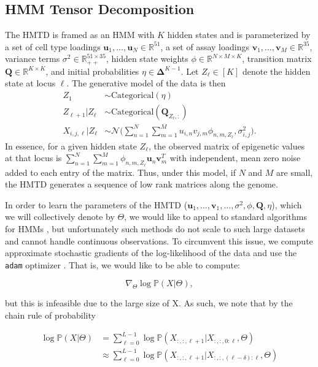 \documentclass[11pt]{article}
\begin{document}
\subsection{HMM Tensor Decomposition}
The HMTD is framed as an HMM with $K$ hidden states and is parameterized by a set of cell type loadings $\mathbf{u}_1,\ldots,\mathbf{u}_N \in \mathbb{R}^{51}$, a set of assay loadings $\mathbf{v}_1,\ldots,\mathbf{v}_M \in \mathbb{R}^{35}$, variance terms $\sigma^2 \in \mathbb{R}_{++}^{51\times35}$, hidden state weights $\phi \in \mathbb{R}^{N \times M \times K}$, transition matrix $\mathbf{Q} \in \mathbb{R}^{K \times K}$, and initial probabilities $\eta \in \mathbf{\Delta}^{K-1}$. Let $Z_\ell \in [K]$ denote the hidden state at locus $\ell$. The generative model of the data is then
\begin{align*}
Z_1 &\sim \text{Categorical}(\eta)\\
Z_{\ell + 1} | Z_{\ell} &\sim \text{Categorical}(\mathbf{Q}_{Z_\ell, :})\\
X_{i, j, \ell} | Z_{\ell} & \sim \mathcal{N}\Bigg(\sum_{n=1}^N\sum_{m=1}^M u_{i,n} v_{j,m} \phi_{n,m,Z_\ell}, \sigma^2_{i,j}\Bigg).
\end{align*}
In essence, for a given hidden state $Z_{\ell}$, the observed matrix of epigenetic values at that locus is $\sum_{n=1}^N \sum_{m=1}^M \phi_{n,m,Z_{\ell}}\mathbf{u}_n\mathbf{v}_m^T$ with independent, mean zero noise added to each entry of the matrix. Thus, under this model, if $N$ and $M$ are small, the HMTD generates a sequence of low rank matrices along the genome.

In order to learn the parameters of the HMTD ($\mathbf{u}_1,\ldots,\mathbf{v}_1,\ldots,\sigma^2,\phi,\mathbf{Q},\eta$), which we will collectively denote by $\Theta$, we would like to appeal to standard algorithms for HMMs \cite{rabiner1986introduction}, but unfortunately such methods do not scale to such large datasets and cannot handle continuous observations. To circumvent this issue, we compute approximate stochastic gradients of the log-likelihood of the data and use the \texttt{adam} optimizer \cite{kingma2015adam}. That is, we would like to be able to compute:

\[
\nabla_\Theta \log\mathbb{P}(X | \Theta),
\]

but this is infeasible due to the large size of X. As such, we note that by the chain rule of probability

\begin{align*}
\log\mathbb{P}(X | \Theta) &= \sum_{\ell=0}^{L-1} \log\mathbb{P}(X_{:, :, \ell+1} | X_{:, :, 0:\ell}, \Theta)\\
&\approx \sum_{\ell=0}^{L-1} \log\mathbb{P}(X_{:, :, \ell+1} | X_{:, :, (\ell-\delta):\ell}, \Theta)
\end{align*}
\end{document}
